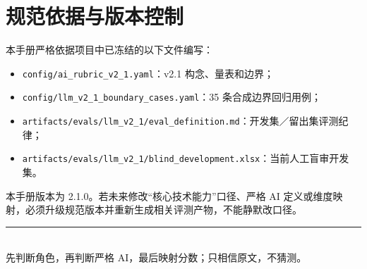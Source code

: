 \documentclass[11pt,a4paper,fontset=none]{ctexart}
\begin{document}
\section{规范依据与版本控制}

本手册严格依据项目中已冻结的以下文件编写：

\begin{itemize}
  \item \texttt{config/ai\_rubric\_v2\_1.yaml}：v2.1 构念、量表和边界；
  \item \texttt{config/llm\_v2\_1\_boundary\_cases.yaml}：35 条合成边界回归用例；
  \item \texttt{artifacts/evals/llm\_v2\_1/eval\_definition.md}：开发集／留出集评测纪律；
  \item \texttt{artifacts/evals/llm\_v2\_1/blind\_development.xlsx}：当前人工盲审开发集。
\end{itemize}

本手册版本为 2.1.0。若未来修改“核心技术能力”口径、严格 AI 定义或维度映射，必须升级规范版本并重新生成相关评测产物，不能静默改口径。

\vfill
\begin{center}
\color{graytext}
\rule{0.72\textwidth}{0.4pt}\\[0.4em]
先判断角色，再判断严格 AI，最后映射分数；只相信原文，不猜测。
\end{center}
\end{document}
